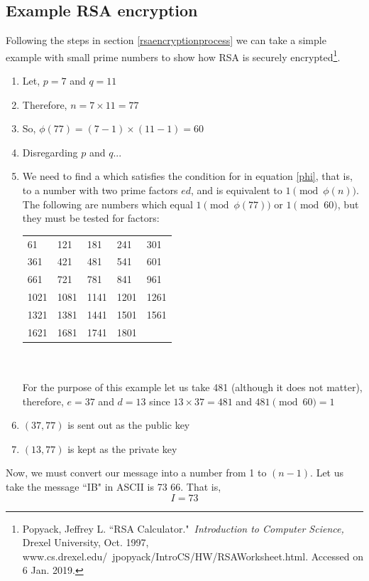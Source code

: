 \documentclass[a4paper,12pt]{article}
\theoremstyle{definition}
\begin{document}
\subsection{Example RSA encryption}
Following the steps in section \ref{rsaencryptionprocess} we can take a simple example with small prime numbers to show how RSA is securely encrypted\footnote{Popyack, Jeffrey L. ``RSA Calculator." \textit{Introduction to Computer Science,} Drexel University, Oct. 1997, www.cs.drexel.edu/~jpopyack/IntroCS/HW/RSAWorksheet.html. Accessed on 6 Jan. 2019.}.
\begin{enumerate}
	\item Let, $p=7$ and $q=11$
	\item Therefore, $n=7 \times 11 = 77$
	\item So, $\phi(77)=(7-1) \times (11-1) = 60$
	\item Disregarding $p$ and $q$...
	\item We need to find a which satisfies the condition for in equation \ref{phi}, that is, to a number with two prime factors $ed$, and is equivalent to $1 \pmod{\phi(n)}$. The following are numbers which equal $1 \pmod{\phi(77)}$ or $1 \pmod{60}$, but they must be tested for factors:
\begin{table}[h]
\centering
\begin{tabular}{lllll}
61  & 121 & 181 & 241 & 301 \\
361 &  421   & 481    & 541    & 601    \\
 661   &  721   &  781   & 841    & 961     \\
1021    & 1081    &1141     & 1201    & 1261 \\
1321 & 1381 & 1441 & 1501 & 1561 \\
1621 & 1681 & 1741 & 1801  
\end{tabular}
\end{table}
	 \\\\ For the purpose of this example let us take 481 (although it does not matter), therefore,  $e=37$ and $d=13$ since $13 \times 37 = 481$ and $481 \pmod{60}=1$
	\item $(37,77)$ is sent out as the public key
	\item $(13,77)$ is kept as the private key
\end{enumerate}
Now, we must convert our message into a number from 1 to $(n-1)$. Let us take the message ``IB" in ASCII is 73 66. That is,
\begin{equation*}
	I=73
\end{equation*}
\end{document}
